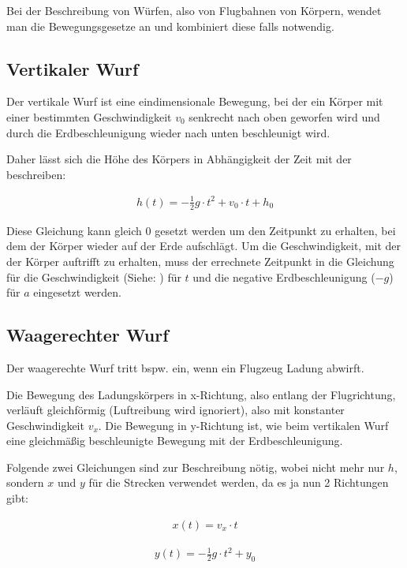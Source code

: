 Bei der Beschreibung von Würfen, also von Flugbahnen von Körpern, wendet man die Bewegungsgesetze an und kombiniert diese falls notwendig.


\subsection{Vertikaler Wurf}

Der vertikale Wurf ist eine eindimensionale Bewegung, bei der ein Körper mit einer bestimmten Geschwindigkeit $v_0$ senkrecht nach oben geworfen wird und durch die Erdbeschleunigung wieder nach unten beschleunigt wird.

Daher lässt sich die Höhe des Körpers in Abhängigkeit der Zeit mit der  beschreiben:

\begin{align} \label{eq:wurfvertikal}
	h(t) = -\frac{1}{2}g \cdot t^2 + v_0 \cdot t + h_0
\end{align}

\noindent Diese Gleichung kann gleich $0$ gesetzt werden um den Zeitpunkt zu erhalten, bei dem der Körper wieder auf der Erde aufschlägt. Um die Geschwindigkeit, mit der der Körper auftrifft zu erhalten, muss der errechnete Zeitpunkt in die Gleichung für die Geschwindigkeit (Siehe: ) für $t$ und die negative Erdbeschleunigung ($-g$) für $a$ eingesetzt werden.


\subsection{Waagerechter Wurf}

Der waagerechte Wurf tritt bspw. ein, wenn ein Flugzeug Ladung abwirft.

Die Bewegung des Ladungskörpers in x-Richtung, also entlang der Flugrichtung, verläuft gleichförmig (Luftreibung wird ignoriert), also mit konstanter Geschwindigkeit $v_x$. Die Bewegung in y-Richtung ist, wie beim vertikalen Wurf eine gleichmäßig beschleunigte Bewegung mit der Erdbeschleunigung.

Folgende zwei Gleichungen sind zur Beschreibung nötig, wobei nicht mehr nur $h$, sondern $x$ und $y$ für die Strecken verwendet werden, da es ja nun 2 Richtungen gibt:

\begin{align}
	x(t) = v_x \cdot t
\end{align}

\begin{align}
	y(t) = -\frac{1}{2}g \cdot t^2 + y_0
\end{align}

